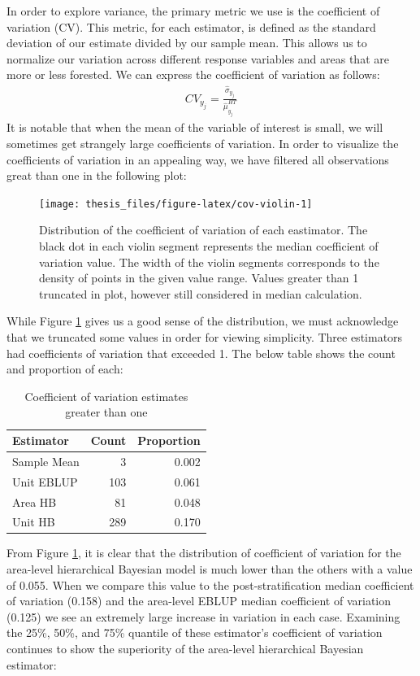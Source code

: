 \documentclass[12pt,twoside]{reedthesis}
\begin{document}
In order to explore variance, the primary metric we use is the coefficient of variation (CV). This metric, for each estimator, is defined as the standard deviation of our estimate divided by our sample mean. This allows us to normalize our variation across different response variables and areas that are more or less forested. We can express the coefficient of variation as follows:
\begin{align}
CV_{y_j} = \frac{\hat\sigma_{y_j}}{\hat\mu_{y_j}^{HT}}
\end{align}
It is notable that when the mean of the variable of interest is small, we will sometimes get strangely large coefficients of variation. In order to visualize the coefficients of variation in an appealing way, we have filtered all observations great than one in the following plot:
\begin{figure}

{\centering \texttt{[image: thesis\_files/figure-latex/cov-violin-1]} 

}

\caption[Distribution of the coefficient of variation of each eastimator]{Distribution of the coefficient of variation of each eastimator. The black dot in each violin segment represents the median coefficient of variation value. The width of the violin segments corresponds to the density of points in the given value range. Values greater than 1 truncated in plot, however still considered in median calculation.}\label{fig:cov-violin}
\end{figure}
While Figure \ref{fig:cov-violin} gives us a good sense of the distribution, we must acknowledge that we truncated some values in order for viewing simplicity. Three estimators had coefficients of variation that exceeded 1. The below table shows the count and proportion of each:
\begin{longtable}[t]{lrr}
\caption{\label{tab:over-one}Coefficient of variation estimates greater than one}\\
\toprule
Estimator & Count & Proportion\\
\midrule
Sample Mean & 3 & 0.002\\
Unit EBLUP & 103 & 0.061\\
Area HB & 81 & 0.048\\
Unit HB & 289 & 0.170\\
\bottomrule
\end{longtable}
From Figure \ref{fig:cov-violin}, it is clear that the distribution of coefficient of variation for the area-level hierarchical Bayesian model is much lower than the others with a value of 0.055. When we compare this value to the post-stratification median coefficient of variation (0.158) and the area-level EBLUP median coefficient of variation (0.125) we see an extremely large increase in variation in each case. Examining the 25\%, 50\%, and 75\% quantile of these estimator's coefficient of variation continues to show the superiority of the area-level hierarchical Bayesian estimator:
\end{document}
